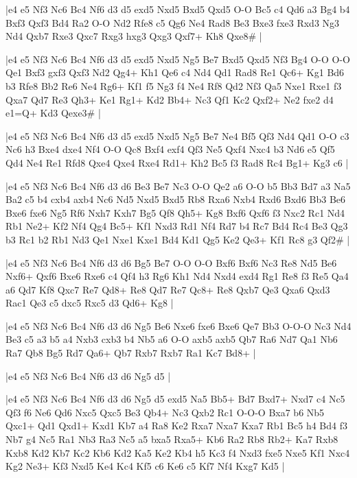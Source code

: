 \whitename{}
\blackname{}
\makegametitle
|e4 e5 Nf3 Nc6 Bc4 Nf6 d3 d5 exd5 Nxd5 Bxd5 Qxd5 O-O Bc5 c4 Qd6 a3 Bg4 b4 Bxf3 Qxf3 Bd4 Ra2 O-O Nd2 Rfe8 c5 Qg6 Ne4 Rad8 Be3 Bxe3 fxe3 Rxd3 Ng3 Nd4 Qxb7 Rxe3 Qxc7 Rxg3 hxg3 Qxg3 Qxf7+ Kh8 Qxe8\#  |

\whitename{}
\blackname{}
\makegametitle
|e4 e5 Nf3 Nc6 Bc4 Nf6 d3 d5 exd5 Nxd5 Ng5 Be7 Bxd5 Qxd5 Nf3 Bg4 O-O O-O Qe1 Bxf3 gxf3 Qxf3 Nd2 Qg4+ Kh1 Qe6 c4 Nd4 Qd1 Rad8 Re1 Qc6+ Kg1 Bd6 b3 Rfe8 Bb2 Re6 Ne4 Rg6+ Kf1 f5 Ng3 f4 Ne4 Rf8 Qd2 Nf3 Qa5 Nxe1 Rxe1 f3 Qxa7 Qd7 Re3 Qh3+ Ke1 Rg1+ Kd2 Bb4+ Nc3 Qf1 Kc2 Qxf2+ Ne2 fxe2 d4 e1=Q+ Kd3 Qexe3\#  |

\whitename{}
\blackname{}
\makegametitle
|e4 e5 Nf3 Nc6 Bc4 Nf6 d3 d5 exd5 Nxd5 Ng5 Be7 Ne4 Bf5 Qf3 Nd4 Qd1 O-O c3 Nc6 h3 Bxe4 dxe4 Nf4 O-O Qc8 Bxf4 exf4 Qf3 Ne5 Qxf4 Nxc4 b3 Nd6 e5 Qf5 Qd4 Ne4 Re1 Rfd8 Qxe4 Qxe4 Rxe4 Rd1+ Kh2 Bc5 f3 Rad8 Rc4 Bg1+ Kg3 c6  |

\whitename{}
\blackname{}
\makegametitle
|e4 e5 Nf3 Nc6 Bc4 Nf6 d3 d6 Be3 Be7 Nc3 O-O Qe2 a6 O-O b5 Bb3 Bd7 a3 Na5 Ba2 c5 b4 cxb4 axb4 Nc6 Nd5 Nxd5 Bxd5 Rb8 Rxa6 Nxb4 Rxd6 Bxd6 Bb3 Be6 Bxe6 fxe6 Ng5 Rf6 Nxh7 Kxh7 Bg5 Qf8 Qh5+ Kg8 Bxf6 Qxf6 f3 Nxc2 Rc1 Nd4 Rb1 Ne2+ Kf2 Nf4 Qg4 Bc5+ Kf1 Nxd3 Rd1 Nf4 Rd7 b4 Rc7 Bd4 Rc4 Be3 Qg3 b3 Rc1 b2 Rb1 Nd3 Qe1 Nxe1 Kxe1 Bd4 Kd1 Qg5 Ke2 Qe3+ Kf1 Rc8 g3 Qf2\#  |

\whitename{}
\blackname{}
\makegametitle
|e4 e5 Nf3 Nc6 Bc4 Nf6 d3 d6 Bg5 Be7 O-O O-O Bxf6 Bxf6 Nc3 Re8 Nd5 Be6 Nxf6+ Qxf6 Bxe6 Rxe6 c4 Qf4 h3 Rg6 Kh1 Nd4 Nxd4 exd4 Rg1 Re8 f3 Re5 Qa4 a6 Qd7 Kf8 Qxc7 Re7 Qd8+ Re8 Qd7 Re7 Qc8+ Re8 Qxb7 Qe3 Qxa6 Qxd3 Rac1 Qe3 c5 dxc5 Rxc5 d3 Qd6+ Kg8  |

\whitename{}
\blackname{}
\makegametitle
|e4 e5 Nf3 Nc6 Bc4 Nf6 d3 d6 Ng5 Be6 Nxe6 fxe6 Bxe6 Qe7 Bb3 O-O-O Nc3 Nd4 Be3 c5 a3 b5 a4 Nxb3 cxb3 b4 Nb5 a6 O-O axb5 axb5 Qb7 Ra6 Nd7 Qa1 Nb6 Ra7 Qb8 Bg5 Rd7 Qa6+ Qb7 Rxb7 Rxb7 Ra1 Kc7 Bd8+  |

\whitename{}
\blackname{}
\makegametitle
|e4 e5 Nf3 Nc6 Bc4 Nf6 d3 d6 Ng5 d5  |

\whitename{}
\blackname{}
\makegametitle
|e4 e5 Nf3 Nc6 Bc4 Nf6 d3 d6 Ng5 d5 exd5 Na5 Bb5+ Bd7 Bxd7+ Nxd7 c4 Nc5 Qf3 f6 Ne6 Qd6 Nxc5 Qxc5 Be3 Qb4+ Nc3 Qxb2 Rc1 O-O-O Bxa7 b6 Nb5 Qxc1+ Qd1 Qxd1+ Kxd1 Kb7 a4 Ra8 Ke2 Rxa7 Nxa7 Kxa7 Rb1 Bc5 h4 Bd4 f3 Nb7 g4 Nc5 Ra1 Nb3 Ra3 Nc5 a5 bxa5 Rxa5+ Kb6 Ra2 Rb8 Rb2+ Ka7 Rxb8 Kxb8 Kd2 Kb7 Kc2 Kb6 Kd2 Ka5 Ke2 Kb4 h5 Kc3 f4 Nxd3 fxe5 Nxe5 Kf1 Nxc4 Kg2 Ne3+ Kf3 Nxd5 Ke4 Kc4 Kf5 c6 Ke6 c5 Kf7 Nf4 Kxg7 Kd5  |

